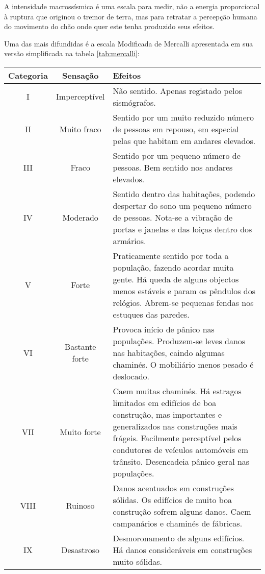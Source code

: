 A intensidade macrossísmica é uma escala para medir, não a energia proporcional
à ruptura que originou o tremor de terra, mas para retratar a percepção humana do
movimento do chão onde quer este tenha produzido seus efeitos.

Uma das mais difundidas é a escala Modificada de Mercalli \citep{richter_1958} apresentada em sua versão simplificada 
na tabela \ref{tab:mercalli}:

\begin{table}[H]
\begin{center}
\begin{scriptsize}
\noindent\begin{tabular}{c|c|p{12cm}}
\hline
Categoria  	& Sensação & Efeitos \\
\hline
I 			&	Imperceptível 	&	Não sentido. Apenas registado pelos sismógrafos.
\\II 		&	Muito fraco 	&	Sentido por um muito reduzido número de pessoas em 
								repouso, em especial pelas que habitam em andares
								elevados.
\\III 		&	Fraco 			&	Sentido por um pequeno número de pessoas. Bem sentido nos andares elevados.
\\IV 		&	Moderado 		&	Sentido dentro das habitações, podendo despertar do sono um pequeno número de pessoas. 
								Nota-se a vibração de
								portas e janelas e das loiças dentro dos armários.
\\V 		&	Forte 			&	Praticamente sentido por toda a população, fazendo acordar muita gente. 
								Há queda de alguns objectos menos estáveis e param os pêndulos dos relógios. 
								Abrem-se pequenas fendas nos estuques das paredes.
\\VI 		&	Bastante forte 	&	Provoca início de pânico nas populações. Produzem-se leves danos nas habitações, 
								caindo algumas chaminés. O mobiliário menos pesado é deslocado.
\\VII 		&	Muito forte 	&	Caem muitas chaminés. Há estragos limitados em edifícios de boa construção, 
								mas importantes e generalizados nas construções mais frágeis. 
								Facilmente perceptível pelos condutores de veículos automóveis em trânsito. 
								Desencadeia pânico geral nas populações.
\\VIII 		&	Ruinoso  		&	Danos acentuados em construções sólidas. Os edifícios de muito boa construção 
								sofrem alguns danos. Caem campanários e chaminés de fábricas.
\\IX 		&	Desastroso 		&	Desmoronamento de alguns edifícios. Há danos consideráveis em construções muito sólidas.

\end{tabular}
\end{scriptsize}
\end{center}
\end{table}
